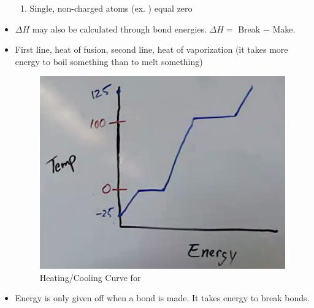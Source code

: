 \documentclass[12pt]{article}
\begin{document}
\begin{itemize}
\begin{enumerate}
      \item Single, non-charged atoms (ex. ) equal zero

    \end{enumerate}

  \item $\Delta H$ may also be calculated through bond energies. $\Delta H=$ Break $-$ Make.

  \item First line, heat of fusion, second line, heat of vaporization (it takes more energy to boil something than to melt something)

    \begin{figure}[H]
      \centering
      \includegraphics{Figures/HeatCooling.png}
      \caption{Heating/Cooling Curve for }
      \label{fig:1}
    \end{figure}

  \item Energy is only given off when a bond is made. It takes energy to break bonds.

\end{itemize}
\end{document}
